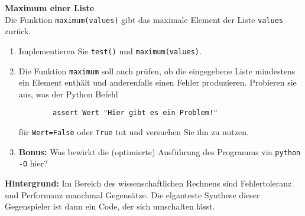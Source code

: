 \textbf{Maximum einer Liste}\\
Die Funktion \verb|maximum(values)| gibt das maximale Element der Liste \verb|values| zurück.
\begin{enumerate}
	\item Implementieren Sie \verb|test()| und \verb|maximum(values)|. 
	\item Die Funktion \verb|maximum| soll auch prüfen, ob die eingegebene Liste mindestens ein Element enthält und anderenfalls einen Fehler produzieren.
	Probieren sie aus, was der Python Befehl
	\begin{lstlisting}
		assert Wert "Hier gibt es ein Problem!"\end{lstlisting}
	für \verb|Wert=False| oder \verb|True| tut und versuchen Sie ihn zu nutzen.
	\item \textbf{Bonus: } Was bewirkt die (optimierte) Ausführung des Programms via \verb|python -O| hier?
\end{enumerate}
\textbf{Hintergrund: } Im Bereich des wissenschaftlichen Rechnens sind Fehlertoleranz und Performanz manchmal Gegensätze. Die elganteste Synthese dieser Gegenspieler ist dann ein Code, der sich umschalten lässt. \\
